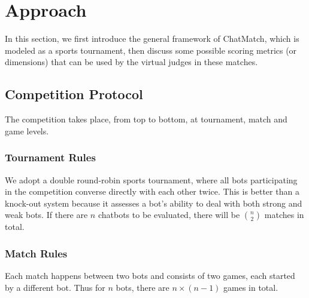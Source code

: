 \section{Approach}
\label{sec:approach}
In this section, we first introduce the general framework of ChatMatch, which is modeled as
a sports tournament, then discuss some possible scoring metrics (or dimensions) 
that can be used by the virtual judges in these matches. 


\subsection{Competition Protocol}
\label{sec:competition}
The competition takes place, from top to bottom, at tournament, match and
game levels.

\subsubsection{Tournament Rules}
We adopt a double round-robin 
sports tournament, where all bots participating in the competition 
converse directly with each other twice.
This is better than a knock-out system because it assesses a bot's ability to
deal with both strong and weak bots.
If there are $n$ chatbots to be evaluated, 
there will be $n \choose 2$ matches in total.

\subsubsection{Match Rules}
Each match happens between two bots and consists of two games,
each started by a different bot. Thus for $n$ bots, there are
$n \times (n-1)$ games in total. 

